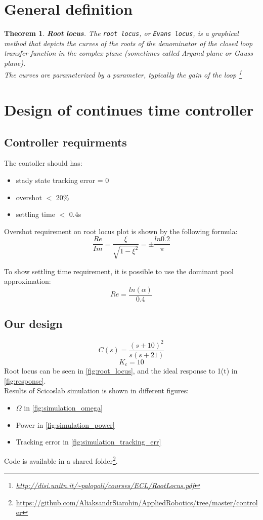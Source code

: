\documentclass[a4paper,12pt,oneside]{article}
\newtheorem{thm}[equation]{Theorem}
\begin{document}
\section{General definition}

\begin{thm}
\textbf{Root locus}. The \texttt{root locus}, or \texttt{Evans locus}, is a graphical method that
depicts the curves of the roots of the denominator of the
closed loop transfer function in the complex plane
(sometimes called Argand plane or Gauss plane). \\ The curves are parameterized by a parameter, typically the
gain of the loop  \footnote{\url{http://disi.unitn.it/~palopoli/courses/ECL/RootLocus.pdf}}
\end{thm}

\section{Design of continues time controller}
\subsection{Controller requirments}
The contoller should has:
\begin{itemize}
\item stady state tracking error = 0
\item overshot $<$ 20\%
\item settling time $<$ 0.4s
\end{itemize}
Overshot requirement on root locus plot is shown by the following formula:
\begin{equation}
\frac{Re}{Im} = \frac{\xi}{\sqrt{1-\xi^{2}}} = \pm\frac{ln{0.2}}{\pi}
\end{equation}

To show settling time requirement, it is possible to use the dominant pool approximation:
\begin{equation}
Re = \frac{ln(\alpha)}{0.4}
\end{equation}

\subsection{Our design}
\begin{equation}
C(s) = \frac{(s+10)^2}{s(s+21)}
\end{equation}
\begin{equation}
K_c = 10
\end{equation}
Root locus can be seen in \cref{fig:root_locus}, and the ideal response to 1(t) in \cref{fig:response}.\\ Results of Scicoslab simulation is shown in different figures:
\begin{itemize}
\item $\Omega$ in \cref{fig:simulation_omega}
\item Power in \cref{fig:simulation_power}
\item Tracking error in \cref{fig:simulation_tracking_err}
\end{itemize}
Code is available in a shared folder\footnote{\url{https://github.com/AliaksandrSiarohin/AppliedRobotics/tree/master/controler}}.
\end{document}

